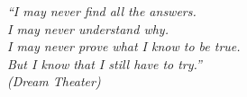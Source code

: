 \begin{epigrafe}
    \vspace*{\fill}
	\begin{flushright}
	\textit{``I may never find all the answers.\\
	         I may never understand why.\\
	         I may never prove what I know to be true.\\
	         But I know that I still have to try.''\\
		(Dream Theater)}
	\end{flushright}
\end{epigrafe}
\newpage